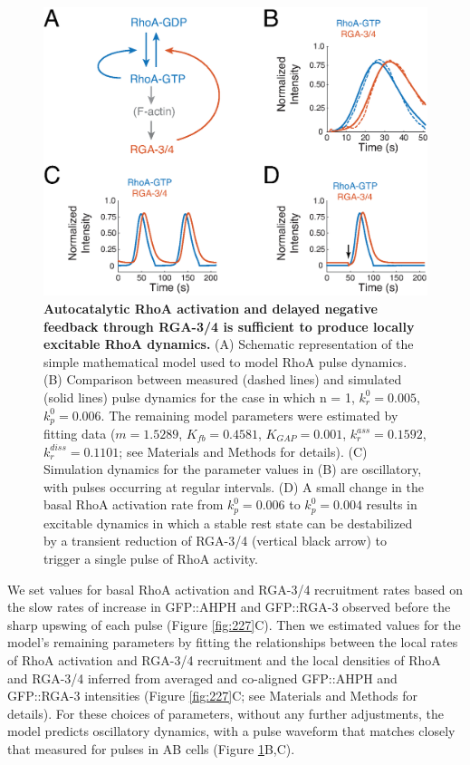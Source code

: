 \begin{figure}[!htbp]
\centering
\includegraphics[width=1\textwidth]{pulse/Figure2-9}

\caption{\label{fig:229}\textbf{Autocatalytic RhoA activation and delayed negative feedback through RGA-3/4 is sufficient to produce locally excitable RhoA dynamics.} (A) Schematic representation of the simple mathematical model used to model RhoA pulse dynamics. (B) Comparison between measured (dashed lines) and simulated (solid lines) pulse dynamics for the case in which n = 1, $k_{r}^0 = 0.005$, $k_{p}^0 = 0.006$.  The remaining model parameters were estimated by fitting data ($m=1.5289$, $K_{fb}=0.4581$, $K_{GAP}=0.001$, $k_{r}^{ass}=0.1592$, $k_{r}^{diss}=0.1101$; see Materials and Methods for details).  (C) Simulation dynamics for the parameter values in (B) are oscillatory, with pulses occurring at regular intervals.  (D)  A small change in the basal RhoA activation rate from $k_{p}^0 = 0.006$ to $k_{p}^0 = 0.004$ results in excitable dynamics in which a stable rest state can be destabilized by a transient reduction of RGA-3/4 (vertical black arrow) to trigger a single pulse of RhoA activity.}
\end{figure}



We set values for basal RhoA activation and RGA-3/4 recruitment rates based on the slow rates of increase in GFP::AHPH and GFP::RGA-3 observed before the sharp upswing of each pulse (Figure \ref{fig:227}C). Then we estimated values for the model’s remaining parameters by fitting the relationships between the local rates of RhoA activation and RGA-3/4 recruitment and the local densities of RhoA and RGA-3/4 inferred from averaged and co-aligned GFP::AHPH and GFP::RGA-3 intensities  (Figure \ref{fig:227}C; see Materials and Methods for details).   For these choices of parameters,  without any further adjustments, the model predicts oscillatory dynamics, with a pulse waveform that matches closely that measured for pulses in AB cells (Figure \ref{fig:229}B,C).  

